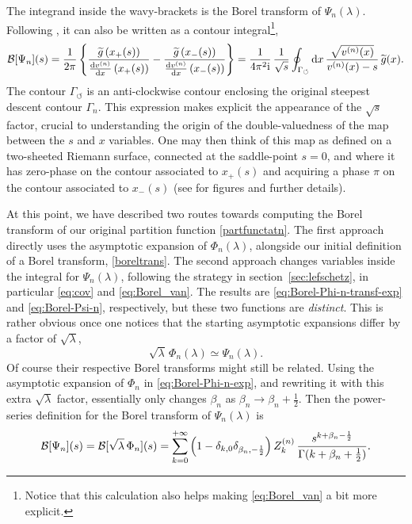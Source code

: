 \documentclass[11pt,a4paper]{article}
\newcommand{\CB}{{\cal B}}
\newcommand{\be}{\begin{equation}}
\newcommand{\ee}{\end{equation}}
\newcommand{\rmi}{{\mathrm{i}}}
\newcommand{\rmd}{{\mathrm{d}}}
\begin{document}
%
\noindent
The integrand inside the wavy-brackets is the Borel transform of $\Psi_{n} (\lambda)$. Following \citep{bh91}, it can also be written as a contour integral\footnote{Notice that this calculation also helps making \eqref{eq:Borel_van} a bit more explicit.},
%
\begin{equation}
\label{eq:Borel-Psi-n}
\CB[\Psi_{n}](s) = \frac{1}{2\pi} \left\{ \frac{\widetilde{g} \left( x_{+}(s) \right)}{\frac{\rmd v^{(n)}}{\rmd x} \left( x_{+}(s) \right)} - \frac{\widetilde{g} \left( x_{-}(s) \right)}{\frac{\rmd v^{(n)}}{\rmd x} \left( x_{-}(s) \right)}\right\} = \frac{1}{4\pi^{2}\rmi}\, \frac{1}{\sqrt{s}} \oint_{\Gamma_{\circlearrowleft}} \rmd x\, \frac{\sqrt{v^{(n)} (x)}}{v^{(n)} (x) - s}\, \widetilde{g}(x).
\end{equation}
%
\noindent
The contour $\Gamma_{\circlearrowleft}$ is an anti-clockwise contour enclosing the original steepest descent contour $\Gamma_n$. This expression makes explicit the appearance of the $\sqrt{s}$ factor, crucial to understanding the origin of the double-valuedness of the map between the $s$ and $x$ variables. One may then think of this map as defined on a two-sheeted Riemann surface, connected at the saddle-point $s=0$, and where it has zero-phase on the contour associated to $x_{+}(s)$ and acquiring a phase $\pi$ on the contour associated to $x_{-}(s)$ (see \cite{bh91} for figures and further details).

At this point, we have described two routes towards computing the Borel transform of our original partition function \eqref{partfunctatn}. The first approach directly uses the asymptotic expansion of $\Phi_{n}(\lambda)$, alongside our initial definition of a Borel transform, \eqref{boreltrans}. The second approach changes variables inside the integral for $\Psi_{n}(\lambda)$, following the strategy in section~\ref{sec:lefschetz}, in particular \eqref{eq:cov} and \eqref{eq:Borel_van}. The results are \eqref{eq:Borel-Phi-n-transf-exp} and \eqref{eq:Borel-Psi-n}, respectively, but these two functions are \textit{distinct}. This is rather obvious once one notices that the starting asymptotic expansions differ by a factor of $\sqrt{\lambda}$,
%
\begin{equation}
\sqrt{\lambda}\, \Phi_{n}(\lambda) \simeq \Psi_{n}(\lambda).
\end{equation}
%
\noindent
Of course their respective Borel transforms might still be related. Using the asymptotic expansion of $\Phi_{n}$ in \eqref{eq:Borel-Phi-n-exp}, and rewriting it with this extra $\sqrt{\lambda}$ factor, essentially only changes $\beta_n$ as $\beta_n \to \beta_n+\frac{1}{2}$. Then the power-series definition for the Borel transform of $\Psi_{n}(\lambda)$ is
%
\be
\label{eq:borelwithsquareroot}
\CB[\Psi_{n}](s) = \CB[\sqrt{\lambda}\, \Phi_{n}](s) = \sum_{k=0}^{+\infty} \left( 1 - \delta_{k,0} \delta_{\beta_n,-\frac{1}{2}} \right) Z_k^{(n)}\, \frac{s^{k+\beta_n-\frac{1}{2}}}{\Gamma (k+\beta_n+\frac{1}{2})}.
\ee
\end{document}
